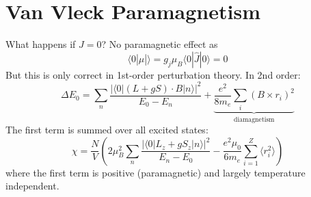 \documentclass[a4paper, 11pt, normalem]{report}
\begin{document}
\section{Van Vleck Paramagnetism}
What happens if $J=0$?
No paramagnetic effect as
\begin{equation} 
    \langle 0|\hat{\mu}|\rangle = g_j\mu_B\langle 0|\hat{J}|0\rangle = 0
\end{equation}
But this is only correct in 1st-order perturbation theory. 
In 2nd order:
\begin{equation}
    \Delta E_0 = \sum_n \frac{|\langle 0|(L+gS)\cdot B|n\rangle|^2}{E_0-E_n} +\underbrace{\frac{e^2}{8m_e}\sum_i (B\times r_i)^2}_{\text{diamagnetism}}
\end{equation}
The first term is summed over all excited states:
\begin{equation}
    \chi = \frac{N}{V}\left(2\mu_B^2\sum_n\frac{|\langle 0|L_z + gS_z|n\rangle|^2}{E_n-E_0} - \frac{e^2\mu_0}{6m_e}\sum_{i=1}^Z \langle r_i^2\rangle\right)
\end{equation}
where the first term is positive (paramagnetic) and largely temperature independent.
\end{document}
